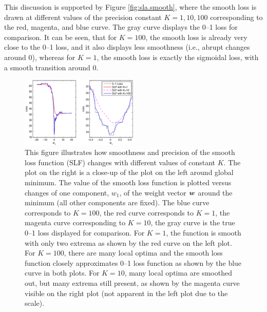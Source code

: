 This discussion is supported by Figure \ref{fig:sla.smooth}, where the smooth loss is drawn at different values of the precision constant $K=1, 10, 100$ corresponding to the red, magenta, and blue curve. The gray curve displays the 0--1 loss for comparison. It can be seen, that for $K=100$, the smooth loss is already very close to the 0--1 loss, and it also displays less smoothness (i.e., abrupt changes around 0), whereas for $K=1$, the smooth loss is exactly the sigmoidal loss, with a smooth transition around 0.


\begin{figure}[here]
\includegraphics[width=0.50\textwidth]{images/fig53_smoothfunction.eps}
\caption{
This figure illustrates how smoothness and precision of the smooth loss function (SLF) changes with different values of constant $K$. The plot on the right is a close-up of the plot on the left around global minimum. The value of the smooth loss function is plotted versus changes of one component, $w_1$, of the weight vector $\boldsymbol{w}$ around the minimum (all other components are fixed). The blue curve corresponds to $K=100$, the red curve corresponds to $K=1$, the magenta curve corresponding to $K=10$, the gray curve is the true 0--1 loss displayed for comparison. For $K=1$, the function is smooth with only two extrema as shown by the red curve on the left plot. For $K=100$, there are many local optima and the smooth loss function closely approximates 0--1 loss function as shown by the blue curve in both plots. For $K=10$, many local optima are smoothed out, but many extrema still present, as shown by the magenta curve visible on the right plot (not apparent in the left plot due to the scale).
}
\label{fig:sla.smoothfunction}
\end{figure}

